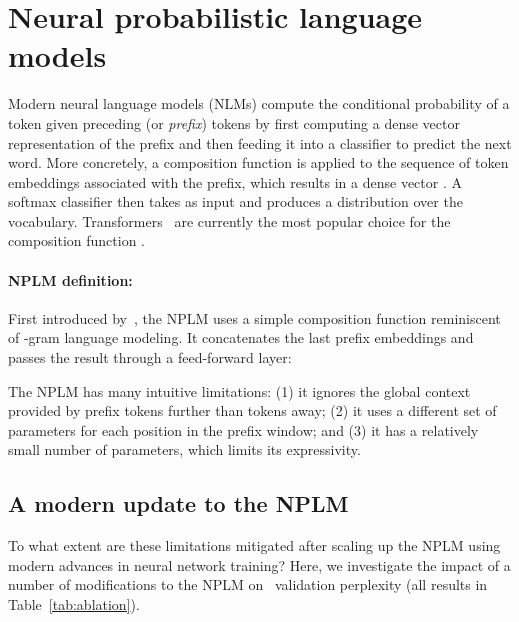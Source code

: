 \documentclass[11pt]{article}
\begin{document}
%
 


\section{Neural probabilistic language models}

Modern neural language models (NLMs) compute the conditional probability of a token  given preceding (or \emph{prefix}) tokens  by first computing a dense vector representation of the prefix and then feeding it into a classifier to predict the next word. More concretely, a composition function  is applied to the sequence of token embeddings  associated with the prefix, which results in a dense vector . A softmax classifier then takes  as input and produces a distribution  over the vocabulary. Transformers~\citep{NIPS2017_3f5ee243} are currently the most popular choice for the composition function .







\paragraph{NPLM definition:} First introduced by~\citet{Bengio2003ANP}, the NPLM uses a simple composition function reminiscent of -gram language modeling. It concatenates the last  prefix embeddings and passes the result through a feed-forward layer:



The NPLM has many intuitive limitations: (1) it ignores the global context provided by prefix tokens further than  tokens away; (2) it uses a different set of parameters for each position in the prefix window; and (3) it has a relatively small number of parameters, which limits its expressivity.

\subsection{A modern update to the NPLM}
To what extent are these limitations mitigated after scaling up the NPLM using modern advances in neural network training? Here, we investigate the impact of a number of modifications to the NPLM on 
\wtthree\ validation perplexity (all results in Table~\ref{tab:ablation}).
\end{document}
